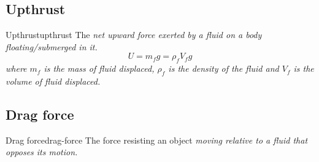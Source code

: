 \subsection{Upthrust}
\begin{definition}{Upthrust}{upthrust}
	The \it{net upward force} exerted by a fluid on a body floating/submerged in it.
	\[U = m_f g = \rho_f V_f g\]
	where \(m_f\) is the mass of fluid displaced, \(\rho_f\) is the density of the fluid and \(V_f\) is the volume of fluid displaced.
\end{definition}
\subsection{Drag force}
\begin{definition}{Drag force}{drag-force}
	The force resisting an object \it{moving relative to a fluid} that \it{opposes}
	its motion.
\end{definition}
